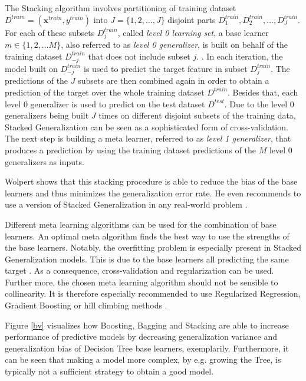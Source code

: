 \documentclass[12pt]{article}
\begin{document}
The Stacking algorithm involves partitioning of training dataset $D^{train} = (\mathbf{x}^{train}, y^{train})$ into $J = \{1, 2,..., J\}$ disjoint parts $D^{train}_1, D^{train}_2,..., D^{train}_J$. For each of these subsets $D^{train}_j$, called \textit{level 0 learning set}, a base learner $m \in \{1,2,...M\}$, also referred to as \textit{level 0 generalizer}, is built on behalf of the training dataset $D^{train}_{-j}$ that does not include subset $j$. \citep[cp.]{wolpert1992stacked}. In each iteration, the model built on $D^{train}_{-j}$ is used to predict the target feature in subset $D^{train}_j$. The predictions of the $J$ subsets are then combined again in order to obtain a prediction of the target over the whole training dataset $D^{train}$. Besides that, each level 0 generalizer is used to predict on the test dataset $D^{test}$. Due to the level 0 generalizers being built $J$ times on different disjoint subsets of the training data, Stacked Generalization can be seen as a sophisticated form of cross-validation. The next step is building a meta learner, referred to as \textit{level 1 generalizer}, that produces a prediction by using the training dataset predictions of the $M$ level 0 generalizers as inputs. 

Wolpert shows that this stacking procedure is able to reduce the bias of the base learners and thus minimizes the generalization error rate. He even recommends to use a version of Stacked Generalization in any real-world problem \citep[p.2]{wolpert1992stacked}. 

Different meta learning algorithms can be used for the combination of base learners. An optimal meta algorithm finds the best way to use the strengths of the base learners. Notably, the overfitting problem is especially present in Stacked Generalization models. This is due to the base learners all predicting the same target \citep{online2017stacking}. As a consequence, cross-validation and regularization can be used. Further more, the chosen meta learning algorithm should not be sensible to collinearity. It is therefore especially recommended to use Regularized Regression, Gradient Boosting or hill climbing methods \citep{SASpaper}. 

Figure \ref{bv} visualizes how  Boosting, Bagging and Stacking are able to increase performance of predictive models by decreasing generalization variance and generalization bias of Decision Tree base learners, exemplarily. Furthermore, it can be seen that making a model more complex, by e.g. growing the Tree, is typically not a sufficient strategy to obtain a good model.
\end{document}
